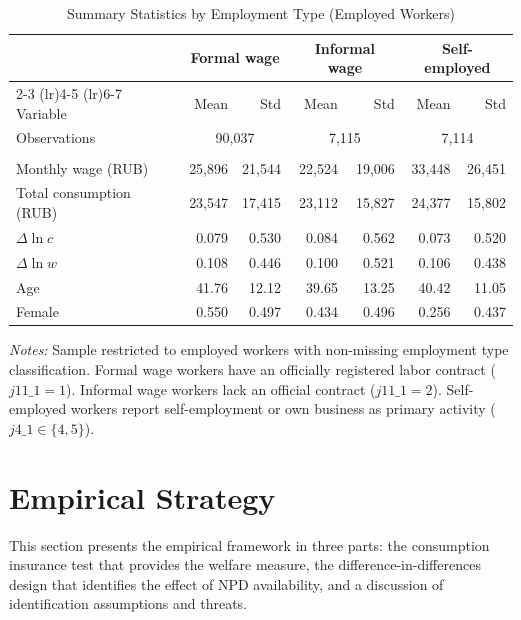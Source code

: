 \documentclass[12pt]{article}
\begin{document}
\begin{table}[htbp]
\centering
\caption{Summary Statistics by Employment Type (Employed Workers)}
\label{tab:summary_emptype}
\small
\begin{tabular}{l*{3}{rr}}
\toprule
 & \multicolumn{2}{c}{Formal wage} & \multicolumn{2}{c}{Informal wage} & \multicolumn{2}{c}{Self-employed} \\
\cmidrule(lr){2-3} \cmidrule(lr){4-5} \cmidrule(lr){6-7}
Variable & Mean & Std & Mean & Std & Mean & Std \\
\midrule
Observations & \multicolumn{2}{c}{90,037} & \multicolumn{2}{c}{7,115} & \multicolumn{2}{c}{7,114} \\
\\
Monthly wage (RUB) & 25,896 & 21,544 & 22,524 & 19,006 & 33,448 & 26,451 \\
Total consumption (RUB) & 23,547 & 17,415 & 23,112 & 15,827 & 24,377 & 15,802 \\
$\Delta \ln c$ & 0.079 & 0.530 & 0.084 & 0.562 & 0.073 & 0.520 \\
$\Delta \ln w$ & 0.108 & 0.446 & 0.100 & 0.521 & 0.106 & 0.438 \\
Age & 41.76 & 12.12 & 39.65 & 13.25 & 40.42 & 11.05 \\
Female & 0.550 & 0.497 & 0.434 & 0.496 & 0.256 & 0.437 \\
\bottomrule
\end{tabular}
\begin{minipage}{0.9\textwidth}
\vspace{0.3em}
\footnotesize \textit{Notes:} Sample restricted to employed workers with non-missing employment type classification. Formal wage workers have an officially registered labor contract ($j11\_1 = 1$). Informal wage workers lack an official contract ($j11\_1 = 2$). Self-employed workers report self-employment or own business as primary activity ($j4\_1 \in \{4, 5\}$).
\end{minipage}
\end{table}


\section{Empirical Strategy}
\label{sec:empirical}

This section presents the empirical framework in three parts: the consumption insurance test that provides the welfare measure, the difference-in-differences design that identifies the effect of NPD availability, and a discussion of identification assumptions and threats.
\end{document}
